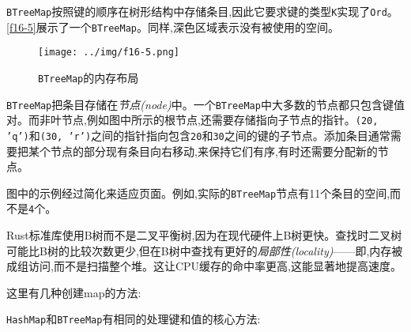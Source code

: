 \texttt{BTreeMap}按照键的顺序在树形结构中存储条目,因此它要求键的类型\texttt{K}实现了\texttt{Ord}。\autoref{f16-5}展示了一个\texttt{BTreeMap}。同样,深色区域表示没有被使用的空间。

\begin{figure}[htbp]
    \centering
    \texttt{[image: ../img/f16-5.png]}
    \caption{\texttt{BTreeMap}的内存布局}
    \label{f16-5}
\end{figure}

\texttt{BTreeMap}把条目存储在\emph{节点(node)}中。一个\texttt{BTreeMap}中大多数的节点都只包含键值对。而非叶节点,例如图中所示的根节点,还需要存储指向子节点的指针。\texttt{(20, 'q')}和\texttt{(30, 'r')}之间的指针指向包含\texttt{20}和\texttt{30}之间的键的子节点。添加条目通常需要把某个节点的部分现有条目向右移动,来保持它们有序,有时还需要分配新的节点。

图中的示例经过简化来适应页面。例如,实际的\texttt{BTreeMap}节点有11个条目的空间,而不是\texttt{4}个。

Rust标准库使用B树而不是二叉平衡树,因为在现代硬件上B树更快。查找时二叉树可能比B树的比较次数更少,但在B树中查找有更好的\emph{局部性(locality)}——即,内存被成组访问,而不是扫描整个堆。这让CPU缓存的命中率更高,这能显著地提高速度。

这里有几种创建map的方法:




\texttt{HashMap}和\texttt{BTreeMap}有相同的处理键和值的核心方法:





